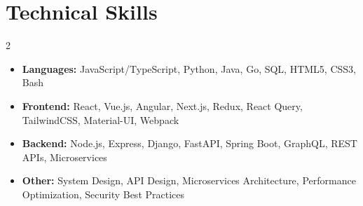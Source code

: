 
\section{Technical Skills}
\begin{multicols}{2}
\begin{itemize}[nosep,after=\strut, leftmargin=1em, itemsep=3pt,label={\color{primary}$\bullet$}]
\item \textbf{Languages:} JavaScript/TypeScript, Python, Java, Go, SQL, HTML5, CSS3, Bash
\item \textbf{Frontend:} React, Vue.js, Angular, Next.js, Redux, React Query, TailwindCSS, Material-UI, Webpack
\item \textbf{Backend:} Node.js, Express, Django, FastAPI, Spring Boot, GraphQL, REST APIs, Microservices
\item \textbf{Other:} System Design, API Design, Microservices Architecture, Performance Optimization, Security Best Practices
\end{itemize}
\end{multicols}

